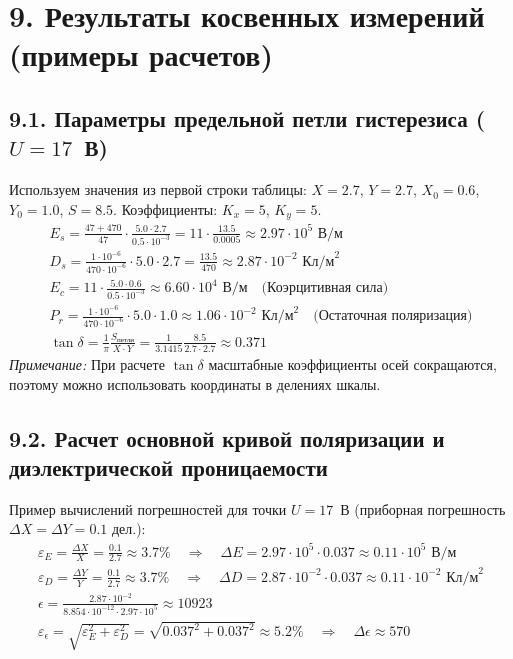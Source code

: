 \documentclass[a4paper,12pt]{article}
\begin{document}
\section*{\hspace{30pt}9. Результаты косвенных измерений (примеры расчетов)}

\subsection*{9.1. Параметры предельной петли гистерезиса ($U = 17$~В)}
Используем значения из первой строки таблицы: $X = 2.7$, $Y = 2.7$, $X_0 = 0.6$, $Y_0 = 1.0$, $S = 8.5$. Коэффициенты: $K_x = 5$, $K_y = 5$.
\begin{gather*}
    E_s = \frac{47 + 470}{47} \cdot \frac{5.0 \cdot 2.7}{0.5 \cdot 10^{-3}} = 11 \cdot \frac{13.5}{0.0005} \approx 2.97 \cdot 10^5 \text{ В/м} \\
    D_s = \frac{1 \cdot 10^{-6}}{470 \cdot 10^{-6}} \cdot 5.0 \cdot 2.7 = \frac{13.5}{470} \approx 2.87 \cdot 10^{-2} \text{ Кл/м}^2 \\
    E_c = 11 \cdot \frac{5.0 \cdot 0.6}{0.5 \cdot 10^{-3}} \approx 6.60 \cdot 10^4 \text{ В/м} \quad \text{(Коэрцитивная сила)} \\
    P_r = \frac{1 \cdot 10^{-6}}{470 \cdot 10^{-6}} \cdot 5.0 \cdot 1.0 \approx 1.06 \cdot 10^{-2} \text{ Кл/м}^2 \quad \text{(Остаточная поляризация)} \\
    \tan \delta = \frac{1}{\pi} \frac{S_{\text{петли}}}{X \cdot Y} = \frac{1}{3.1415} \frac{8.5}{2.7 \cdot 2.7} \approx 0.371
\end{gather*}
\textit{Примечание:} При расчете $\tan \delta$ масштабные коэффициенты осей сокращаются, поэтому можно использовать координаты в делениях шкалы.

\subsection*{9.2. Расчет основной кривой поляризации и диэлектрической проницаемости}

Пример вычислений погрешностей для точки $U = 17$~В (приборная погрешность $\Delta X = \Delta Y = 0.1$ дел.):
\begin{gather*}
    \varepsilon_E = \frac{\Delta X}{X} = \frac{0.1}{2.7} \approx 3.7\% \quad \Rightarrow \quad \Delta E = 2.97 \cdot 10^5 \cdot 0.037 \approx 0.11 \cdot 10^5 \text{ В/м} \\
    \varepsilon_D = \frac{\Delta Y}{Y} = \frac{0.1}{2.7} \approx 3.7\% \quad \Rightarrow \quad \Delta D = 2.87 \cdot 10^{-2} \cdot 0.037 \approx 0.11 \cdot 10^{-2} \text{ Кл/м}^2 \\
    \epsilon = \frac{2.87 \cdot 10^{-2}}{8.854 \cdot 10^{-12} \cdot 2.97 \cdot 10^5} \approx 10923 \\
    \varepsilon_\epsilon = \sqrt{\varepsilon_E^2 + \varepsilon_D^2} = \sqrt{0.037^2 + 0.037^2} \approx 5.2\% \quad \Rightarrow \quad \Delta\epsilon \approx 570
\end{gather*}
\end{document}
